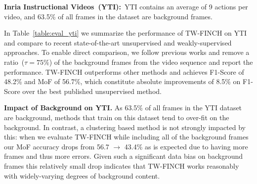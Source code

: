 \documentclass[10pt,twocolumn,letterpaper]{article}
\begin{document}
\noindent\textbf{Inria Instructional Videos~(YTI):}\ YTI contains an average of 9 actions per video, and 63.5\% of all frames in the dataset are background frames.

In Table~\ref{table:eval_yti} we summarize the performance of TW-FINCH on YTI and compare to recent state-of-the-art unsupervised and weakly-supervised approaches. To enable direct comparison, we follow previous works and remove a ratio~($\tau=75\%$) of the background frames from the video sequence and report the performance. TW-FINCH  outperforms other methods and achieves F1-Score of 48.2\% and MoF of 56.7\%, which constitute absolute improvements of 8.5\% on F1-Score over the best published unsupervised method. 

\textbf{Impact of Background on YTI.} As  63.5\% of all frames in the YTI dataset are background, methods that train on this dataset tend to over-fit on the background. 
In contrast, a clustering based method is not strongly impacted by this: when we evaluate TW-FINCH while including all of the background frames our MoF accuracy drops from 56.7 $\rightarrow$ 43.4\% as is expected due to having more frames and thus more errors. Given such a significant data bias on background frames this relatively small drop indicates 
that TW-FINCH works reasonably with widely-varying degrees of background content.
\end{document}
